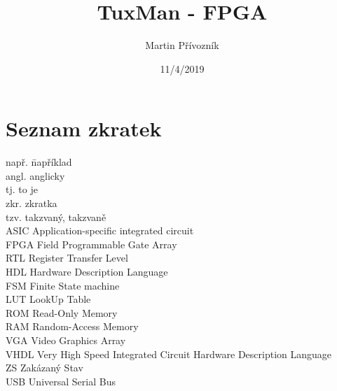 \documentclass{report}
\title{TuxMan - FPGA}
\date{11/4/2019}
\author{Martin Přívozník}
\begin{document}
  
  \newpage

 

\newpage
\tableofcontents
\listoffigures
\listoftables
\clearpage
\chapter*{Seznam zkratek}
\begin{tabbing}
    např. \hspace{2em} \= například \\
    angl.  \>  anglicky \\
    tj.  \>  to je \\
    zkr.  \>  zkratka \\
    tzv. \> takzvaný, takzvaně \\
    ASIC  \>  Application-specific integrated circuit \\
    FPGA  \>  Field Programmable Gate Array \\
    RTL  \>  Register Transfer Level \\
   HDL \> Hardware Description Language \\
   FSM \> Finite State machine \\
   LUT \> LookUp Table \\
  ROM \> Read-Only Memory \\
 RAM \> Random-Access Memory \\
 VGA \> Video Graphics Array \\
 VHDL \> Very High Speed Integrated Circuit Hardware Description Language \\
 ZS \> Zakázaný Stav \\
 USB \> Universal Serial Bus \\
\end{tabbing}

\newpage
{}
\end{document}
